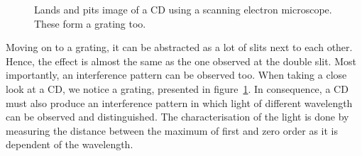 \begin{minipage}{0.99\linewidth}
\begin{minipage}{0.25\linewidth}
\begin{scriptsize}
\begin{center}
\begin{figure}[H]
                    \caption{Lands and pits image of a CD using a scanning electron microscope. These form a grating too. \cite{src_cd}}
                    \label{fig_lands_pits}
                \end{figure}
            \end{center}
            \end{scriptsize}
        \end{minipage}
    \end{minipage}

    Moving on to a grating, it can be abstracted as a lot of slits next to each other.
    Hence, the effect is almost the same as the one observed at the double slit.
    Most importantly, an interference pattern can be observed too.
    When taking a close look at a CD, we notice a grating, presented in figure~\ref{fig_lands_pits}.
    In consequence, a CD must also produce an interference pattern in which light of different wavelength can be observed and distinguished.
    The characterisation of the light is done by measuring the distance between the maximum of first and zero order as it is dependent of the wavelength.

